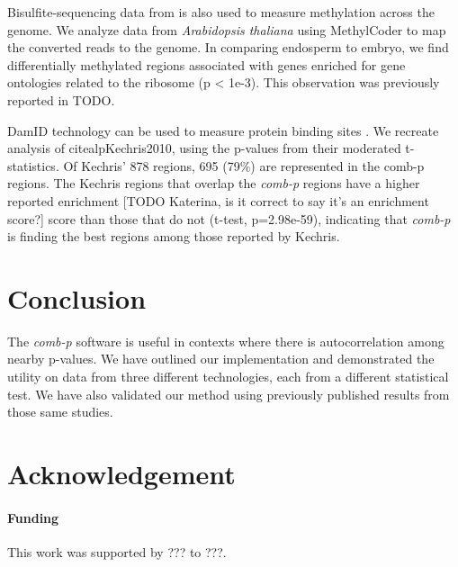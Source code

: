 \documentclass{bioinfo}
\begin{document}
\begin{methods}
Bisulfite-sequencing data from \citealp{Hsieh2009} is also used to measure
methylation across the genome.
We analyze data from {\it Arabidopsis thaliana} using MethylCoder
\citep{Pedersen2011} to map the converted reads to the genome. In
comparing endosperm to
embryo, we find differentially methylated regions associated with genes
enriched for gene ontologies related to the ribosome (p < 1e-3).
This observation was previously reported in TODO.

DamID technology can be used to measure protein binding sites \citealp{Steensel2001}.
We recreate analysis of citealp{Kechris2010}, using the p-values from their moderated
t-statistics. Of Kechris' 878 regions, 695 (79\%) are represented in the comb-p regions.
The Kechris regions that overlap the \textit{comb-p} regions have a higher reported
enrichment [TODO Katerina, is it correct to say it's an enrichment score?] score than
those that do not (t-test, p=2.98e-59), indicating that \textit{comb-p} is finding the
best regions among those reported by Kechris.

\end{methods}

\section{Conclusion}
The \textit{comb-p} software is useful in contexts where there is
autocorrelation among nearby p-values. We have outlined our implementation
and demonstrated the utility on data from three different technologies,
each from a different statistical test. We have also validated our method
using previously published results from those same studies.

\section*{Acknowledgement}

\paragraph{Funding\textcolon} This work was supported by ??? to ???.

%
%
%
%
%
%
%
\end{document}
